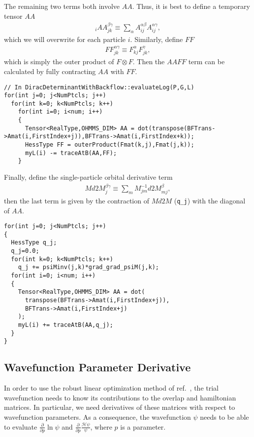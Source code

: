 The remaining two terms both involve $AA$. Thus, it is best to define a temporary tensor $AA$
\begin{align}
{}_iAA_{jk}^{\beta\gamma} \equiv \sum\limits_\alpha A_{ij}^{\alpha\beta} A_{ij}^{\alpha\gamma},
\end{align}
which we will overwrite for each particle $i$. Similarly, define $FF$
\begin{align}
FF_{jk}^{\alpha\gamma} \equiv F_{kj}^\alpha F_{jk}^\gamma,
\end{align}
which is simply the outer product of $F\otimes F$. Then the $AAFF$ term can be calculated by fully contracting $AA$ with $FF$.
\begin{lstlisting}
// In DiracDeterminantWithBackflow::evaluateLog(P,G,L)
for(int j=0; j<NumPtcls; j++)
  for(int k=0; k<NumPtcls; k++)
    for(int i=0; i<num; i++)
    {
      Tensor<RealType,OHMMS_DIM> AA = dot(transpose(BFTrans->Amat(i,FirstIndex+j)),BFTrans->Amat(i,FirstIndex+k));
      HessType FF = outerProduct(Fmat(k,j),Fmat(j,k));
      myL(i) -= traceAtB(AA,FF);
    }
\end{lstlisting}
Finally, define the single-particle orbital derivative term
\begin{align}
Md2M_j^{\beta\gamma} \equiv \sum\limits_m M^{-1}_{jm} d2M_{mj}^\beta,
\end{align}
then the last term is given by the contraction of $Md2M$ (\verb|q_j|) with the diagonal of $AA$.
\begin{lstlisting}
for(int j=0; j<NumPtcls; j++)
{
  HessType q_j;
  q_j=0.0;
  for(int k=0; k<NumPtcls; k++)
    q_j += psiMinv(j,k)*grad_grad_psiM(j,k);
  for(int i=0; i<num; i++)
  {
    Tensor<RealType,OHMMS_DIM> AA = dot(
      transpose(BFTrans->Amat(i,FirstIndex+j)),
      BFTrans->Amat(i,FirstIndex+j)
    );
    myL(i) += traceAtB(AA,q_j);
  }
}
\end{lstlisting}

\subsection{Wavefunction Parameter Derivative}
In order to use the robust linear optimization method of ref.~\cite{Toulouse2007linear}, the trial wavefunction needs to know its contributions to the overlap and hamiltonian matrices. In particular, we need derivatives of these matrices with respect to wavefunction parameters. As a consequence, the wavefunction $\psi$ needs to be able to evaluate $\frac{\partial}{\partial p} \ln \psi$ and $\frac{\partial}{\partial p} \frac{\mathcal{H}\psi}{\psi}$, where $p$ is a parameter.

